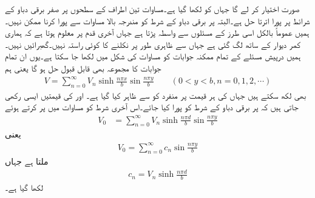 صورت اختیار کر لے  گا جہاں  کو  لکھا گیا ہے۔مساوات  تین اطراف کے سطحوں پر صفر برقی دباو کے شرائط پر پورا اترتا حل ہے۔البتہ  پر  برقی دباو کے شرط کو مندرجہ بالا مساوات سے پورا کرنا ممکن نہیں۔ہمیں عموماً بالکل اسی طرز کے مسئلوں سے واسطہ پڑتا ہے جہاں آخری قدم پر معلوم ہوتا ہے کہ ہماری کمر دیوار کے ساتھ لگ گئی ہے جہاں سے ظاہری طور پر نکلنے کا کوئی راستہ نہیں۔گھبرائیں نہیں۔ہمیں درپیش مسئلے کے تمام ممکنہ جوابات کو مساوات  کی شکل میں لکھا جا سکتا ہے۔یوں ان تمام جوابات کا مجموعہ بھی قابل قبول حل ہو گا یعنی ہم 
\begin{align}\label{مساوات_لاپلاس_فوریئر_تسلسل_کا_حل}
V=\sum_{n=0}^{\infty} V_{n} \sinh \frac{n\pi x}{b} \sin \frac{n\pi y}{b} \quad \quad (0<y<b,n=0,1,2,\cdots)
\end{align}
بھی لکھ سکتے ہیں جہاں   کی ہر قیمت پر منفرد   کو  سے ظاہر کیا گیا ہے۔  اور  کی قیمتیں ایسی رکھی جاتی ہیں کہ   پر  برقی دباو کے شرط کو پورا کیا جائے۔اس آخری شرط کو مساوات میں پر کرتے ہوئے
\begin{align*}
V_0&=\sum_{n=0}^{\infty} V_{n} \sinh \frac{n\pi d}{b} \sin \frac{n\pi y}{b}
\end{align*}
یعنی
\begin{align}\label{مساوات_لاپلاس_فوریئر_تسلسل_حل}
V_0=\sum_{n=0}^{\infty} c_n\sin \frac{n\pi y}{b}
\end{align}
ملتا ہے جہاں 
\begin{align*}
c_n=V_n \sinh \frac{n\pi d}{b}
\end{align*}
لکھا گیا ہے۔

